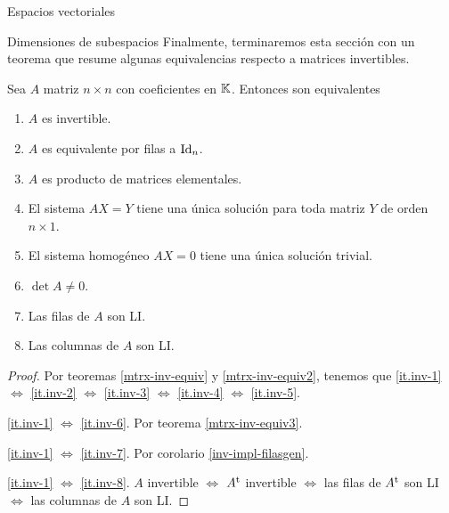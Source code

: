 \begin{chapter}{Espacios vectoriales}
\begin{section}{Dimensiones de subespacios}
Finalmente, terminaremos esta sección con un teorema que resume algunas equivalencias respecto a matrices invertibles.

\begin{teorema}
    Sea $A$ matriz $n \times n$ con coeficientes en $\mathbb K$. Entonces son equivalentes
    \begin{enumerate} 
        \item\label{it.inv-1} $A$ es invertible.
        \item\label{it.inv-2} $A$  es equivalente por filas a $\operatorname{Id}_n$.
        \item\label{it.inv-3} $A$ es producto de matrices elementales.
        \item\label{it.inv-4} El sistema $AX=Y$ tiene una única solución para toda matriz $Y$ de orden $n \times 1$. 
        \item\label{it.inv-5} El sistema homogéneo $AX=0$ tiene una única solución trivial.
        \item\label{it.inv-6} $\det A \ne 0$.
        \item\label{it.inv-7} Las filas de $A$ son LI.
        \item\label{it.inv-8} Las columnas de $A$ son LI.
    \end{enumerate}
\end{teorema}
\begin{proof} Por teoremas \ref{mtrx-inv-equiv} y  \ref{mtrx-inv-equiv2}, tenemos que 	\ref{it.inv-1}$\Leftrightarrow$ 	\ref{it.inv-2} $\Leftrightarrow$ 	\ref{it.inv-3} $\Leftrightarrow$ 	\ref{it.inv-4} $\Leftrightarrow$ 	\ref{it.inv-5}.
    
    \ref{it.inv-1} $\Leftrightarrow$ \ref{it.inv-6}. Por teorema \ref{mtrx-inv-equiv3}.
    
    \ref{it.inv-1} $\Leftrightarrow$ \ref{it.inv-7}. Por corolario \ref{inv-impl-filasgen}.
    
    \ref{it.inv-1} $\Leftrightarrow$ \ref{it.inv-8}. $A$ invertible $\Leftrightarrow$ $A^{\operatorname{t}}$ invertible $\Leftrightarrow$  las filas de $A^{\operatorname{t}}$ son LI $\Leftrightarrow$  las columnas de $A$ son LI. 
\end{proof}
    
    \end{section}



    \end{chapter}